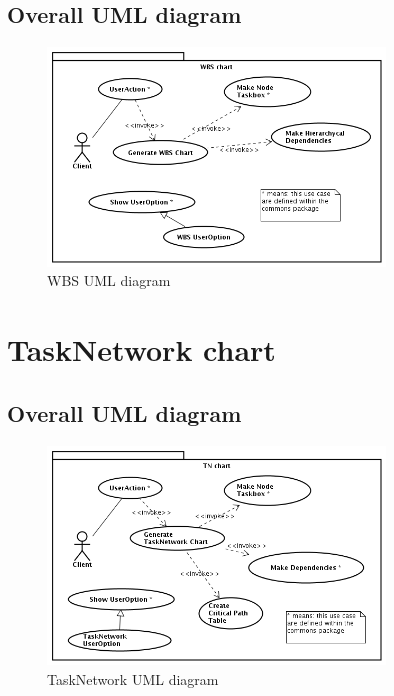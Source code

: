 \documentclass[a4paper, 12pt]{report}
\begin{document}
\section*{Overall UML diagram}
\begin{figure}[h!] \centering
\includegraphics[width=0.8\textwidth]{WBS/WBSChart.png}
\caption{WBS UML diagram}
\label{fig:WBSdiagram}
\end{figure}




\chapter{TaskNetwork chart}
\section*{Overall UML diagram}
\begin{figure}[h!] \centering
\includegraphics[width=0.8\textwidth]{TaskNetwork/img/TNChart.png}
\caption{TaskNetwork UML diagram}
\label{fig:TNdiagram}
\end{figure}



\end{document}

